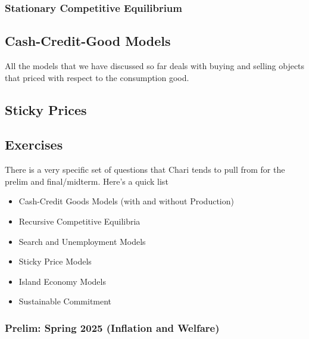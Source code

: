 \documentclass[11pt,english]{article}
\begin{document}
\begin{definition}

\end{definition}

\subsubsection{Stationary Competitive Equilibrium}


\subsection{Cash-Credit-Good Models}
All the models that we have discussed so far deals with buying and selling objects that priced with respect to the consumption good.


\subsection{Sticky Prices}

\subsection{Exercises}

There is a very specific set of questions that Chari tends to pull from for the prelim and final/midterm. Here's a quick list
\begin{itemize}
\item Cash-Credit Goods Models (with and without Production)
\item Recursive Competitive Equilibria
\item Search and Unemployment Models
\item Sticky Price Models
\item Island Economy Models
\item Sustainable Commitment
\end{itemize}

\subsubsection{Prelim: Spring 2025 (Inflation and Welfare)}
\end{document}
